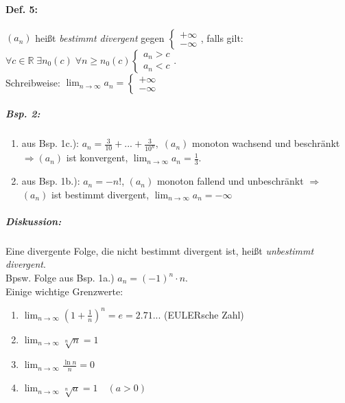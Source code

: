 \paragraph{Def. 5:} \parskp
$(a_n)$ heißt \emph{bestimmt divergent} gegen $\begin{cases}
+\infty\\
- \infty
\end{cases}$, falls gilt: $\forall c \in \mathbb{R} \; \exists n_0(c) \; \forall n \geq n_0(c) \begin{cases}
a_n>c\\
a_n<c
\end{cases}$.\\
Schreibweise: $\boxed{\lim_{n\to \infty} a_n = \begin{cases}
+\infty\\
- \infty
\end{cases}}$
\subparagraph{Bsp. 2:} 
\begin{enumerate}[label=\alph*.)]
\item aus Bsp. 1c.): $a_n=\frac{3}{10}+...+\frac{3}{10^n}, \; (a_n)$ monoton wachsend und beschränkt $\Rightarrow (a_n)$ ist konvergent, $\lim_{n\to \infty}a_n = \frac{1}{3}$. 
\item aus Bsp. 1b.): $a_n=-n!$, $(a_n)$ monoton fallend und unbeschränkt $\Rightarrow$ $(a_n)$ ist bestimmt divergent, $\lim_{n\to \infty}a_n=-\infty$
\end{enumerate}
\subparagraph{Diskussion:}\parskp
Eine divergente Folge, die nicht bestimmt divergent ist, heißt \emph{unbestimmt divergent}.\\
Bpsw. Folge aus Bsp. 1a.) $a_n=(-1)^n\cdot n$.\bigskip\\
Einige wichtige Grenzwerte:
\begin{enumerate} [label=\alph*.)]
\item $\lim_{n\to \infty} \left(1+\frac{1}{n}\right)^n=e=2.71...$ (EULERsche Zahl)
\item $\lim_{n\to\infty} \sqrt[n]{n}=1$
\item $\lim_{n\to\infty} \frac{\ln n}{n}=0$
\item $\lim_{n \to \infty} \sqrt[n]{a}=1 \quad (a>0)$
\end{enumerate}
